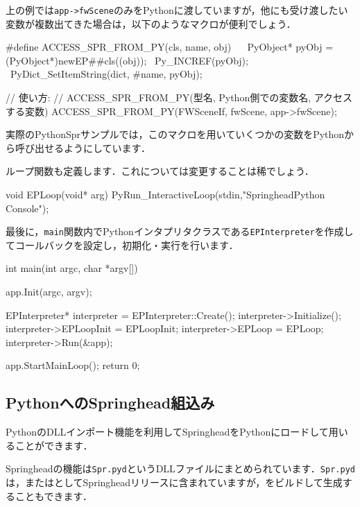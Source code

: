 \KLUDGE 上の例では\texttt{app->fwScene}\KLUDGE のみをPython\KLUDGE に渡していますが，他にも受け渡したい変数が複数出てきた場合は，以下のようなマクロが便利でしょう．
\begin{sourcecode}
#define ACCESS_SPR_FROM_PY(cls, name, obj)           \
{                                                    \
    PyObject* pyObj = (PyObject*)newEP##cls((obj));  \
    Py_INCREF(pyObj);                                \
    PyDict_SetItemString(dict, #name, pyObj);        \
}                                                    \

// 使い方:
// ACCESS_SPR_FROM_PY(型名, Python側での変数名, アクセスする変数)
ACCESS_SPR_FROM_PY(FWSceneIf, fwScene, app->fwScene);
\end{sourcecode}
\KLUDGE 実際のPythonSpr\KLUDGE サンプルでは，このマクロを用いていくつかの変数をPython\KLUDGE から呼び出せるようにしています．

\KLUDGE ループ関数も定義します．これについては変更することは稀でしょう．
\begin{sourcecode}
void EPLoop(void* arg) {
	PyRun_InteractiveLoop(stdin,"SpringheadPython Console");
}
\end{sourcecode}

\KLUDGE 最後に，\texttt{main}\KLUDGE 関数内でPython\KLUDGE インタプリタクラスである\texttt{EPInterpreter}\KLUDGE を作成してコールバックを設定し，初期化・実行を行います．
\begin{sourcecode}
int main(int argc, char *argv[]) {
  app.Init(argc, argv);

  EPInterpreter* interpreter = EPInterpreter::Create();
  interpreter->Initialize();
  interpreter->EPLoopInit = EPLoopInit;
  interpreter->EPLoop = EPLoop;
  interpreter->Run(&app);

  app.StartMainLoop();
  return 0;
}
\end{sourcecode}





\subsection*{Python\KLUDGE へのSpringhead\KLUDGE 組込み}

Python\KLUDGE のDLL\KLUDGE インポート機能を利用してSpringhead\KLUDGE をPython\KLUDGE にロードして用いることができます．

Springhead\KLUDGE の機能は\texttt{Spr.pyd}\KLUDGE というDLL\KLUDGE ファイルにまとめられています．\texttt{Spr.pyd}\KLUDGE は，\KLUDGE または\KLUDGE としてSpringhead\KLUDGE リリースに含まれていますが，\KLUDGE をビルドして生成することもできます．

